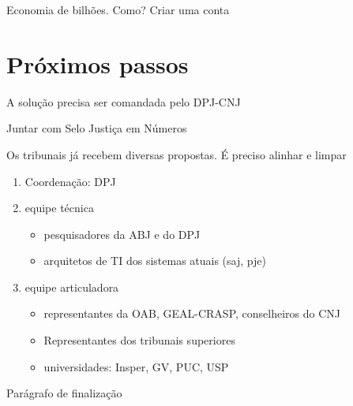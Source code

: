 \documentclass[]{report}
\providecommand{\tightlist}{%
  \setlength{\itemsep}{0pt}\setlength{\parskip}{0pt}}
\begin{document}
Economia de bilhões. Como? Criar uma conta

\section{Próximos passos}\label{proximos-passos}

A solução precisa ser comandada pelo DPJ-CNJ

Juntar com Selo Justiça em Números

Os tribunais já recebem diversas propostas. É preciso alinhar e limpar

\begin{enumerate}
\def\labelenumi{\arabic{enumi}.}
\tightlist
\item
  Coordenação: DPJ
\item
  equipe técnica

  \begin{itemize}
  \tightlist
  \item
    pesquisadores da ABJ e do DPJ
  \item
    arquitetos de TI dos sistemas atuais (saj, pje)
  \end{itemize}
\item
  equipe articuladora

  \begin{itemize}
  \tightlist
  \item
    representantes da OAB, GEAL-CRASP, conselheiros do CNJ
  \item
    Representantes dos tribunais superiores
  \item
    universidades: Insper, GV, PUC, USP
  \end{itemize}
\end{enumerate}

Parágrafo de finalização


\end{document}
